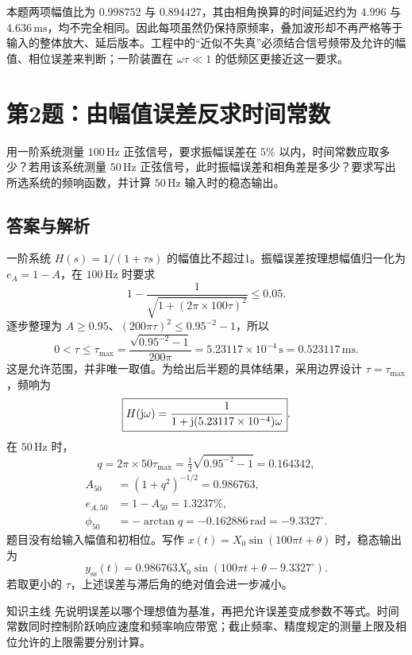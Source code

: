 本题两项幅值比为 $0.998752$ 与 $0.894427$，其由相角换算的时间延迟约为 $4.996$ 与 $4.636\,\mathrm{ms}$，均不完全相同。因此每项虽然仍保持原频率，叠加波形却不再严格等于输入的整体放大、延后版本。工程中的“近似不失真”必须结合信号频带及允许的幅值、相位误差来判断；一阶装置在 $\omega\tau\ll1$ 的低频区更接近这一要求。

\section{第2题：由幅值误差反求时间常数}
\label{hw:3-2}
\begin{hwquestion}
用一阶系统测量 $100\,\mathrm{Hz}$ 正弦信号，要求振幅误差在 $5\%$ 以内，时间常数应取多少？若用该系统测量 $50\,\mathrm{Hz}$ 正弦信号，此时振幅误差和相角差是多少？要求写出所选系统的频响函数，并计算 $50\,\mathrm{Hz}$ 输入时的稳态输出。
\end{hwquestion}

\subsection*{答案与解析}
一阶系统 $H(s)=1/(1+\tau s)$ 的幅值比不超过1。振幅误差按理想幅值归一化为 $e_A=1-A$，在 $100\,\mathrm{Hz}$ 时要求
\[
1-\frac{1}{\sqrt{1+(2\pi\times100\tau)^2}}\leq0.05.
\]
逐步整理为 $A\geq0.95$、$(200\pi\tau)^2\leq0.95^{-2}-1$，所以
\[
\boxed{0<\tau\leq\tau_{\max}
=\frac{\sqrt{0.95^{-2}-1}}{200\pi}
=5.23117\times10^{-4}\,\mathrm{s}=0.523117\,\mathrm{ms}}.
\]
这是允许范围，并非唯一取值。为给出后半题的具体结果，采用边界设计 $\tau=\tau_{\max}$，频响为
\[
\boxed{H(\mathrm{j}\omega)=\frac{1}{1+\mathrm{j}(5.23117\times10^{-4})\omega}}.
\]
在 $50\,\mathrm{Hz}$ 时，
\[
q=2\pi\times50\tau_{\max}
=\tfrac12\sqrt{0.95^{-2}-1}=0.164342,
\]
\begin{align*}
A_{50}&=(1+q^2)^{-1/2}=0.986763,\\
e_{A,50}&=1-A_{50}=\boxed{1.3237\%},\\
\phi_{50}&=-\arctan q
=-0.162886\,\mathrm{rad}=\boxed{-9.3327^\circ}.
\end{align*}
题目没有给输入幅值和初相位。写作 $x(t)=X_0\sin(100\pi t+\theta)$ 时，稳态输出为
\[
\boxed{y_{\mathrm{ss}}(t)=0.986763X_0\sin(100\pi t+\theta-9.3327^\circ)}.
\]
若取更小的 $\tau$，上述误差与滞后角的绝对值会进一步减小。

\begin{focusbox}{知识主线}
先说明误差以哪个理想值为基准，再把允许误差变成参数不等式。时间常数同时控制阶跃响应速度和频率响应带宽；截止频率、精度规定的测量上限及相位允许的上限需要分别计算。
\end{focusbox}

